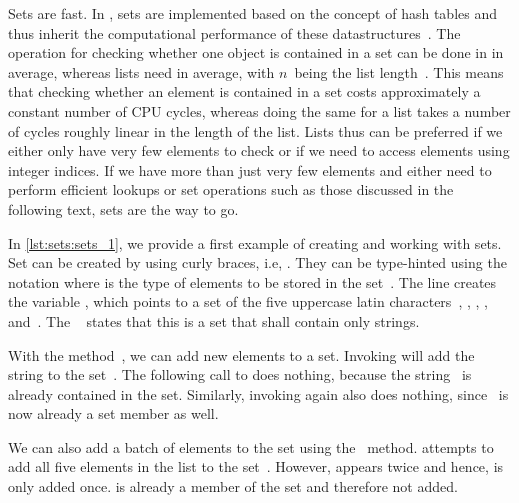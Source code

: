 Sets are fast.
In \python, sets are implemented based on the concept of hash tables and thus inherit the computational performance of these datastructures~\cite{K1998SAS,CLRS2009ITA,SKS2019DSC}.
The operation for checking whether one object is contained in a set can be done in  in average, whereas lists need  in average, with $n$~being the list length~\cite{H2025PM:PBOTTCODDSIPP33,PSF:TPW:TC,N2022CCSFPO}.
This means that checking whether an element is contained in a set costs approximately a constant number of CPU cycles, whereas doing the same for a list takes a number of cycles roughly linear in the length of the list.
Lists thus can be preferred if we either only have very few elements to check or if we need to access elements using integer indices.
If we have more than just very few elements and either need to perform efficient lookups or set operations such as those discussed in the following text, sets are the way to go.%
%
\begin{sloppypar}%
In \cref{lst:sets:sets_1}, we provide a first example of creating and working with sets.
Set  can be created by using curly braces, i.e, .
They can be type-hinted using the notation  where  is the type of elements to be stored in the set~\cite{PEP585}.
The line  creates the variable , which points to a set of the five uppercase latin characters~, , , , and~.
The ~ states that this is a set that shall contain only strings.%
\end{sloppypar}%
%
With the method~, we can add new elements to a set.
Invoking  will add the string  to the set~.
The following call to  does nothing, because the string~ is already contained in the set.
Similarly, invoking  again also does nothing, since~ is now already a set member as well.%
%
\begin{sloppypar}%
We can also add a batch of elements to the set using the ~method.
 attempts to add all five elements in the list \pythonil{["K", "G", "W", "Q", "W"]} to the set~.
However,  appears twice and hence, is only added once.
 is already a member of the set and therefore not added.%
\end{sloppypar}%
